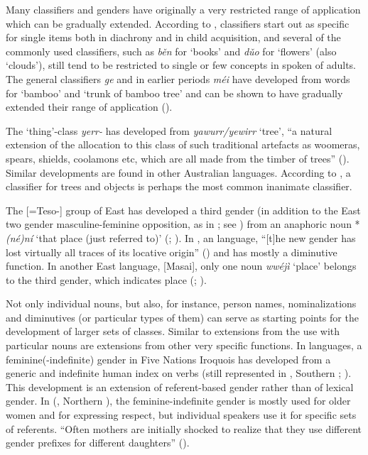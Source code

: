\documentclass[output=collectionpaper]{langsci/langscibook}
\begin{document}
Many classifiers and genders have originally a very restricted range of application which can be gradually extended. According to \cite[428]{Erbaugh1986},  classifiers start out as specific for single items both in diachrony and in child acquisition, and several of the commonly used  classifiers, such as \textit{b\v{e}n} for `books' and \textit{d\v{u}o} for `flowers' (also `clouds'), still tend to be restricted to single or few concepts in spoken  of adults. The  general classifiers  \textit{ge} and in earlier periods \textit{méi} have developed from words for `bamboo' and `trunk of bamboo tree' and can be shown to have gradually extended their range of application (\citealt[429]{Erbaugh1986}).

The  `thing'-class \textit{yerr-} has developed from \textit{yawurr/yewirr} `tree', ``a natural extension of the allocation to this class of such traditional artefacts as woomeras, spears, shields, coolamons etc, which are all made from the timber of trees'' (\citealt[309]{Reid1990}). Similar developments are found in other Australian languages. According to \cite[300]{Allan1977}, a classifier for trees and objects is perhaps the most common inanimate classifier.

The  [=Teso-] group of East  has developed a third gender (in addition to the East  two gender masculine-feminine opposition, as in ; see ) from an anaphoric noun *\textit{(né)ní} `that place (just referred to)' (\citealt[219]{Dimmendaal1983}; \citealt[228]{Heine1984}). In , an  language, ``[t]he new gender has lost virtually all traces of its locative origin'' (\citealt[229]{Heine1984}) and has mostly a diminutive function. In another East  language,  [Masai], only one noun \textit{wwéjì} `place' belongs to the third gender, which indicates place (\citealt[15]{Tucker1955}; \citealt[160]{Payne1998}).

Not only individual nouns, but also, for instance, person names, nominalizations and diminutives (or particular types of them) can serve as starting points for the development of larger sets of classes. Similar to extensions from the use with particular nouns are extensions from other very specific functions. In  languages, a feminine(-indefinite) gender in Five Nations Iroquois has developed from a generic and indefinite human index on verbs (still represented in , Southern ; \citealt[141]{Mithun2014}). This development is an extension of referent-based gender rather than of lexical gender. In  (, Northern ), the feminine-indefinite gender is mostly used for older women and for expressing respect, but individual speakers use it for specific sets of referents. ``Often mothers are initially shocked to realize that they use different gender prefixes for different daughters'' (\citealt[138]{Mithun2014}).
\end{document}
